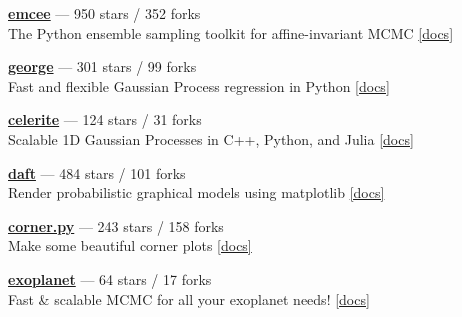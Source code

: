 \item \href{https://github.com/dfm/emcee}{{\bf emcee}} --- 950 stars / 352 forks \\
The Python ensemble sampling toolkit for affine-invariant MCMC \href{http://emcee.readthedocs.io}{[docs]}

\item \href{https://github.com/dfm/george}{{\bf george}} --- 301 stars / 99 forks \\
Fast and flexible Gaussian Process regression in Python \href{http://george.readthedocs.io}{[docs]}

\item \href{https://github.com/dfm/celerite}{{\bf celerite}} --- 124 stars / 31 forks \\
Scalable 1D Gaussian Processes in C++, Python, and Julia \href{http://celerite.rtfd.io}{[docs]}

\item \href{https://github.com/daft-dev/daft}{{\bf daft}} --- 484 stars / 101 forks \\
Render probabilistic graphical models using matplotlib \href{https://docs.daft-pgm.org}{[docs]}

\item \href{https://github.com/dfm/corner.py}{{\bf corner.py}} --- 243 stars / 158 forks \\
Make some beautiful corner plots \href{http://corner.readthedocs.io}{[docs]}

\item \href{https://github.com/dfm/exoplanet}{{\bf exoplanet}} --- 64 stars / 17 forks \\
Fast {\&} scalable MCMC for all your exoplanet needs!  \href{https://exoplanet.dfm.io}{[docs]}